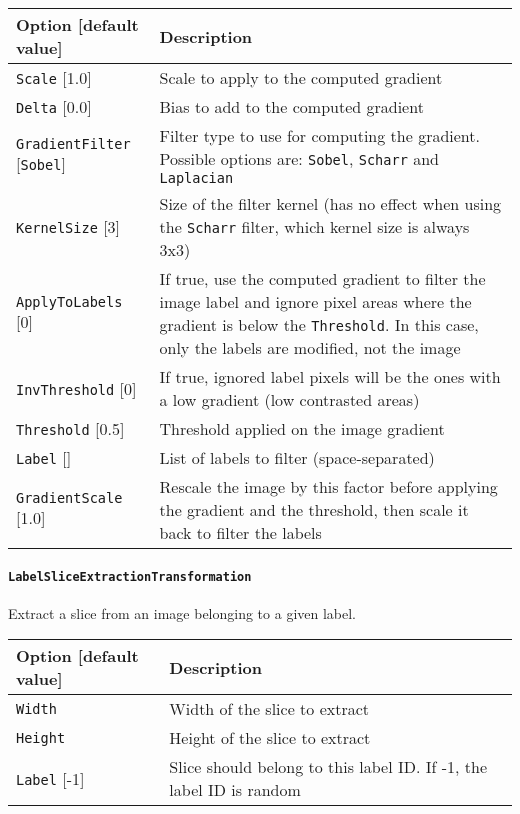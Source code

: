 \documentclass[a4paper,11pt,oneside]{article}
\newcommand{\iponly}{\reversemarginpar
    \marginnote{\color{listletiblue}\normalfont\scriptsize
    {\ttfamily{}\hyperref[sec:N2D2-IP]{\color{listletiblue}N2D2 IP}} \emph{only}}}
\begin{document}
\begin{center}
 \begin{tabular}{| p{5cm} | p{10cm} | }
 \hline
 Option [default value] & Description\\
 \hline\hline
  \lstinline!Scale! [1.0] & Scale to apply to the computed gradient \\
  \lstinline!Delta! [0.0] & Bias to add to the computed gradient \\
  \lstinline!GradientFilter! [\lstinline!Sobel!] & Filter type to use for
  computing the gradient. Possible options are: \lstinline!Sobel!,
  \lstinline!Scharr! and \lstinline!Laplacian! \\
  \lstinline!KernelSize! [3] & Size of the filter kernel (has no effect when
  using the \lstinline!Scharr! filter, which kernel size is always 3x3) \\
  \lstinline!ApplyToLabels! [0] & If true, use the computed gradient to filter
  the image label and ignore pixel areas where the gradient is below the
   \lstinline!Threshold!. In this case, only the labels are modified, not the
    image \\\hline
  \lstinline!InvThreshold! [0] & If true, ignored label pixels will be the ones
  with a low gradient (low contrasted areas) \\
  \lstinline!Threshold! [0.5] & Threshold applied on the image gradient \\
  \lstinline!Label! [] & List of labels to filter (space-separated) \\
  \lstinline!GradientScale! [1.0] & Rescale the image by this factor before
  applying the gradient and the threshold, then scale it back to filter the
   labels \\
 \hline
\end{tabular}
\end{center}


\paragraph{\texorpdfstring{%
\lstinline[basicstyle=\ttfamily\bfseries]!LabelSliceExtractionTransformation!%
\protect\iponly}{LabelSliceExtractionTransformation}}
Extract a slice from an image belonging to a given label.

\begin{center}
 \begin{tabular}{| p{5cm} | p{10cm} | }
 \hline
 Option [default value] & Description\\
 \hline\hline
  \cellcolor{requiredcolor}\lstinline!Width! & Width of the slice to extract \\
  \cellcolor{requiredcolor}\lstinline!Height! & Height of the slice to
  extract \\
  \lstinline!Label! [-1] & Slice should belong to this label ID. If -1, the
  label ID is random \\
 \hline
\end{tabular}
\end{center}
\end{document}
